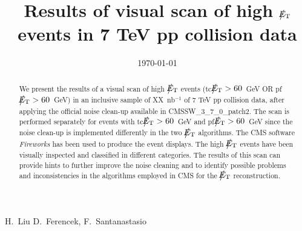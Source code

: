 \documentclass{cmspaper}
\def\etmiss{\big\slash\hspace{-1.6ex}{E_\text{T}}}
\begin{document}
\begin{linenumbers}


\begin{titlepage}


   \date{\today}

  \title{Results of visual scan of high $\etmiss$ events in 7 TeV pp collision data}

  \begin{Authlist}
    H.~Liu
    D.~Ferencek, F.~Santanastasio %
  \end{Authlist}



  \begin{abstract}    
   We present the results of a visual scan of high $\etmiss$ events 
   (tc$\etmiss>60$~GeV OR pf$\etmiss>60$~GeV)
   in an inclusive sample of XX~nb$^{-1}$ of 7 TeV pp collision data, 
   after applying the official noise clean-up available in CMSSW\_3\_7\_0\_patch2. 
   The scan is performed separately for events with tc$\etmiss>60$~GeV and pf$\etmiss>60$~GeV
   since the noise clean-up is implemented differently in the two $\etmiss$ algorithms.
   The CMS software {\it Fireworks} has been used to produce the event displays. 
   The high $\etmiss$ events have been visually inspected and classified in different 
   categories. The results of this scan can provide hints to further improve the noise 
   cleaning and to identify possible problems and inconsistencies in the algorithms employed 
   in CMS for the $\etmiss$ reconstruction.
  \end{abstract} 

  
\end{titlepage}

\setcounter{page}{2}%

\tableofcontents

\clearpage





\clearpage

\clearpage



\end{linenumbers}
\end{document}
